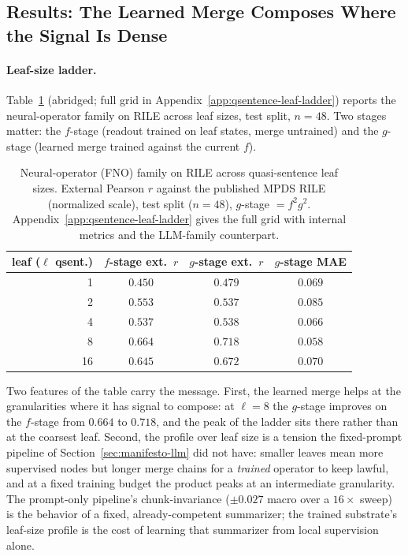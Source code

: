 \subsection{Results: The Learned Merge Composes Where the Signal Is Dense}\label{sec:qsentence-results}

\paragraph{Leaf-size ladder.} Table~\ref{tab:qsentence-fno-ladder}
(abridged; full grid in Appendix~\ref{app:qsentence-leaf-ladder})
reports the neural-operator family on RILE across leaf sizes, test
split, $n = 48$. Two stages matter: the $f$-stage (readout trained on
leaf states, merge untrained) and the $g$-stage (learned merge trained
against the current $f$).

\begin{table}[htbp]
    \centering
    \begin{tabular}{rccc}
    \toprule
    leaf ($\ell$ qsent.) & $f$-stage ext.\ $r$ & $g$-stage ext.\ $r$ & $g$-stage MAE \\
    \midrule
    1  & $0.450$ & $0.479$ & $0.069$ \\
    2  & $0.553$ & $0.537$ & $0.085$ \\
    4  & $0.537$ & $0.538$ & $0.066$ \\
    8  & $0.664$ & $\mathbf{0.718}$ & $0.058$ \\
    16 & $0.645$ & $0.672$ & $0.070$ \\
    \bottomrule
    \end{tabular}
    \caption{Neural-operator (FNO) family on RILE across quasi-sentence
    leaf sizes. External Pearson $r$ against the published MPDS RILE
    (normalized scale), test split ($n=48$), $g$-stage $= f^2g^2$.
    Appendix~\ref{app:qsentence-leaf-ladder} gives the full grid with
    internal metrics and the LLM-family counterpart.}
    \label{tab:qsentence-fno-ladder}
\end{table}

Two features of the table carry the message. First, the learned merge
helps at the granularities where it has signal to compose: at
$\ell = 8$ the $g$-stage improves on the $f$-stage from $0.664$ to
$0.718$, and the peak of the ladder sits there rather than at the
coarsest leaf. Second, the profile over leaf size is a tension the
fixed-prompt pipeline of Section~\ref{sec:manifesto-llm} did not have:
smaller leaves mean more supervised nodes but longer merge chains for
a \emph{trained} operator to keep lawful, and at a fixed training
budget the product peaks at an intermediate granularity. The
prompt-only pipeline's chunk-invariance ($\pm 0.027$ macro over a
$16\times$ sweep) is the behavior of a fixed, already-competent
summarizer; the trained substrate's leaf-size profile is the cost of
learning that summarizer from local supervision alone.

